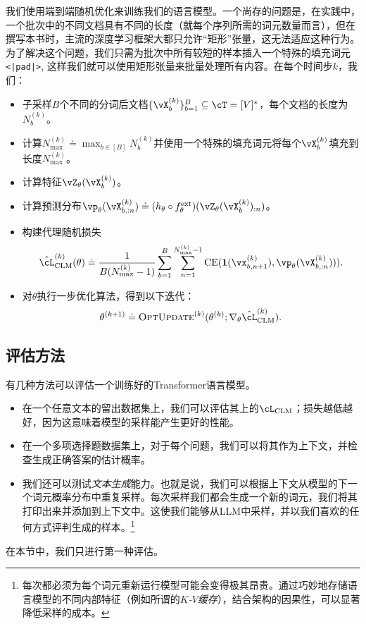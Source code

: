 \documentclass[../../book-main.tex]{subfiles}
\begin{document}
我们使用端到端随机优化来训练我们的语言模型。一个尚存的问题是，在实践中，一个批次中的不同文档具有不同的长度（就每个序列所需的词元数量而言），但在撰写本书时，主流的深度学习框架大都只允许“矩形”张量，这无法适应这种行为。为了解决这个问题，我们只需为批次中所有较短的样本插入一个特殊的填充词元\texttt{<|pad|>}, 这样我们就可以使用矩形张量来批量处理所有内容。在每个时间步\(k\)，我们：
\begin{itemize}
    \item 子采样\(B\)个不同的分词后文档\(\{\vX_{b}^{(k)}\}_{b = 1}^{B} \subseteq \cT = [V]^{*}\)，每个文档的长度为\(N_{b}^{(k)}\)。
    \item 计算\(N_{\max}^{(k)} \doteq \max_{b \in [B]}N_{b}^{(k)}\)并使用一个特殊的填充词元将每个\(\vX_{b}^{(k)}\)填充到长度\(N_{\max}^{(k)}\)。
    \item 计算特征\(\vZ_{\theta}(\vX_{b}^{(k)})\)。
    \item 计算预测分布\(\vp_{\theta}(\vX_{b, :n}^{(k)}) \doteq (h_{\theta} \circ f_{\theta}^{\ext})(\vZ_{\theta}(\vX_{b}^{(k)})_{:n})\)。
    \item 构建代理随机损失
    \begin{equation}
        \hat{\cL}_{\mathrm{CLM}}^{(k)}(\theta) \doteq \frac{1}{B(N_{\max}^{(k)} - 1)}\sum_{b = 1}^{B}\sum_{n = 1}^{N_{\max}^{(k)}-1}\CE(\vone(\vx_{b, n + 1}^{(k)}), \vp_{\theta}(\vX_{b, :n}^{(k)}))).
    \end{equation}
    \item 对\(\theta\)执行一步优化算法，得到以下迭代：
    \begin{equation}
        \theta^{(k + 1)} \doteq \textsc{OptUpdate}^{(k)}(\theta^{(k)}; \nabla_{\theta}\hat{\cL}_{\mathrm{CLM}}^{(k)}).
    \end{equation}
\end{itemize}

\subsection{评估方法} \label{sub:clm_text_evals}

有几种方法可以评估一个训练好的Transformer语言模型。
\begin{itemize}
    \item 在一个任意文本的留出数据集上，我们可以评估其上的\(\cL_{\mathrm{CLM}}\)；损失越低越好，因为这意味着模型的采样能产生更好的性能。
    \item 在一个多项选择题数据集上，对于每个问题，我们可以将其作为上下文，并检查生成正确答案的估计概率。
    \item 我们还可以测试\textit{文本生成}能力。也就是说，我们可以根据上下文从模型的下一个词元概率分布中重复采样。每次采样我们都会生成一个新的词元，我们将其打印出来并添加到上下文中。这使我们能够从LLM中采样，并以我们喜欢的任何方式评判生成的样本。\footnote{每次都必须为每个词元重新运行模型可能会变得极其昂贵。通过巧妙地存储语言模型的不同内部特征（例如所谓的\textit{\(K\)-\(V\)缓存}），结合架构的因果性，可以显著降低采样的成本。}
\end{itemize}
在本节中，我们只进行第一种评估。
\end{document}
